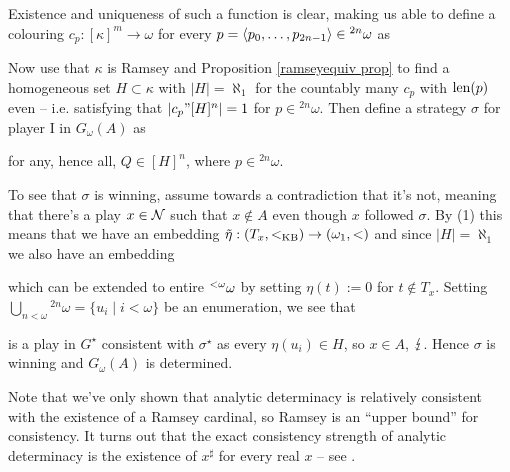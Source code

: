 {Existence and uniqueness of such a function is clear, making us able to define a colouring $c_p:[\kappa]^m\to\omega$ for every $p=\langle p_0,\hdots,p_{2n-1}\rangle\in{^{2n}\omega}$ as 

Now use that $\kappa$ is Ramsey and Proposition \ref{ramseyequiv prop} to find a homogeneous set $H\subset\kappa$ with $|H|=\aleph_1$ for the countably many $c_p$ with $\operatorname{len}(p)$ even -- i.e. satisfying that $|c_p"[H]^n|=1$ for $p\in{^{2n}\omega}$. Then define a strategy $\sigma$ for player I in $G_\omega(A)$ as

for any, hence all, $Q\in[H]^n$, where $p\in{^{2n}\omega}$.

\qquad To see that $\sigma$ is winning, assume towards a contradiction that it's not, meaning that there's a play $x\in\operatorname{\mathcal{N}}$ such that $x\notin A$ even though $x$ followed $\sigma$. By (1) this means that we have an embedding $\tilde\eta:(T_x,\operatorname{<_{\text{KB}}})\to(\omega_1,<)$ and since $|H|=\aleph_1$ we also have an embedding

which can be extended to entire $\operatorname{{^{<\omega}\omega}}$ by setting $\eta(t):=0$ for $t\notin T_x$. Setting $\bigcup_{n<\omega}{^{2n}\omega}=\{u_i\mid i<\omega\}$ be an enumeration, we see that

is a play in $G^\star$ consistent with $\sigma^\star$ as every $\eta(u_i)\in H$, so $x\in A$, $\operatorname{\lightning}$. Hence $\sigma$ is winning and $G_\omega(A)$ is determined.
}

Note that we've only shown that analytic determinacy is relatively consistent with the existence of a Ramsey cardinal, so Ramsey is an ``upper bound'' for consistency. It turns out that the exact consistency strength of analytic determinacy is the existence of $x^\sharp$ for every real $x$ -- see \cite[Theorem 31.2 \& 31.5]{Kanamori}.
